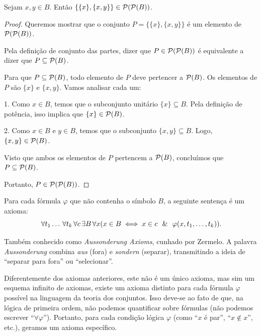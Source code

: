 \begin{proposicao}
    \label{prop:par_ordenado_elemento_ppb}
    Sejam \(x, y \in B\). Então \(\{\{x\}, \{x,y\}\} \in \mathcal{P}(\mathcal{P}(B))\).
\end{proposicao}

\begin{proof}
    Queremos mostrar que o conjunto \(P = \{\{x\}, \{x,y\}\}\) é um elemento de \(\mathcal{P}(\mathcal{P}(B))\).

    Pela definição de conjunto das partes, dizer que \(P \in \mathcal{P}(\mathcal{P}(B))\) é equivalente a dizer que \(P \subseteq \mathcal{P}(B)\).

    Para que \(P \subseteq \mathcal{P}(B)\), todo elemento de \(P\) deve pertencer a \(\mathcal{P}(B)\). Os elementos de \(P\) são \(\{x\}\) e \(\{x,y\}\). Vamos analisar cada um:

    1.  Como \(x \in B\), temos que o subconjunto unitário \(\{x\} \subseteq B\). Pela definição de potência, isso implica que \(\{x\} \in \mathcal{P}(B)\).

    2.  Como \(x \in B\) e \(y \in B\), temos que o subconjunto \(\{x,y\} \subseteq B\). Logo, \(\{x,y\} \in \mathcal{P}(B)\).

    Visto que ambos os elementos de \(P\) pertencem a \(\mathcal{P}(B)\), concluímos que \(P \subseteq \mathcal{P}(B)\).

    Portanto, \(P \in \mathcal{P}(\mathcal{P}(B))\).
\end{proof}

\begin{axioma}
    \label{ax:subconjunto}
    Para cada fórmula \(\varphi\) que não contenha o símbolo \(B\), a seguinte sentença é um axioma:
    \[
        \forall t_1 \dots \forall t_k \forall c \exists B \forall x (x \in B \iff x \in c \e \varphi(x,t_1,\dots,t_k)).
    \]
\end{axioma}



\begin{remark}
    Também conhecido como \emph{Aussonderung Axioms}, cunhado por Zermelo. A palavra \emph{Aussonderung} combina \emph{aus} (fora) e \emph{sondern} (separar), transmitindo a ideia de ``separar para fora''  ou ``selecionar''.
\end{remark}

Diferentemente dos axiomas anteriores, este não é um único axioma, mas sim um esquema infinito de axiomas, existe um axioma distinto para cada fórmula \(\varphi\) possível na linguagem da teoria dos conjuntos. Isso deve-se ao fato de que, na lógica de primeira ordem, não podemos quantificar sobre fórmulas (não podemos escrever ``\(\forall \varphi\)''). Portanto, para cada condição lógica \(\varphi\) (como ``\(x\) é par'', ``\(x \notin x\)'', etc.), geramos um axioma específico.

